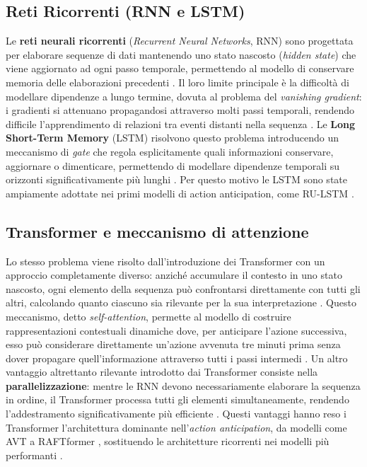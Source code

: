 \subsection{Reti Ricorrenti (RNN e LSTM)}
Le \textbf{reti neurali ricorrenti} (\textit{Recurrent Neural Networks}, RNN) sono progettata per elaborare sequenze di dati mantenendo uno stato nascosto (\textit{hidden state}) che viene aggiornato ad ogni passo temporale, permettendo al modello di conservare memoria delle elaborazioni precedenti \cite{goodfellow2016deep}. Il loro limite principale è la difficoltà di modellare dipendenze a lungo termine, dovuta al problema del \textit{vanishing gradient}: i gradienti si attenuano propagandosi attraverso molti  passi temporali, rendendo difficile l'apprendimento di relazioni tra eventi distanti nella sequenza \cite{goodfellow2016deep}. Le \textbf{Long Short-Term Memory} (LSTM) risolvono questo problema introducendo un meccanismo di \textit{gate} che regola esplicitamente quali informazioni conservare, aggiornare o dimenticare, permettendo di modellare dipendenze temporali su orizzonti significativamente più lunghi \cite{goodfellow2016deep}. Per questo motivo le LSTM sono state ampiamente adottate nei primi modelli di action anticipation, come RU-LSTM \cite{furnari2019would, furnari2020rolling}. 
\subsection{Transformer e meccanismo di attenzione}
Lo stesso problema viene risolto dall'introduzione dei Transformer \cite{vaswani2017attention} con un approccio completamente diverso: anziché accumulare il contesto in uno stato nascosto, ogni elemento della sequenza può confrontarsi direttamente con tutti gli altri, calcolando quanto ciascuno sia rilevante per la sua interpretazione \cite{vaswani2017attention}. Questo meccanismo, detto \textit{self-attention}, permette al modello di costruire rappresentazioni contestuali dinamiche dove, per anticipare l'azione successiva, esso può considerare direttamente un'azione avvenuta tre minuti prima senza dover propagare quell'informazione attraverso tutti i passi intermedi \cite{vaswani2017attention}.
Un altro vantaggio altrettanto rilevante introdotto dai Transformer consiste nella \textbf{parallelizzazione}: mentre le RNN devono necessariamente elaborare la sequenza in ordine, il Transformer processa tutti gli elementi simultaneamente, rendendo l'addestramento significativamente più efficiente \cite{vaswani2017attention}. Questi vantaggi hanno reso i Transformer l'architettura dominante nell'\textit{action anticipation}, da modelli come AVT \cite{girdhar2021anticipative} a RAFTformer \cite{girase2023latency}, sostituendo le architetture ricorrenti nei modelli più performanti \cite{lai2024human}.
